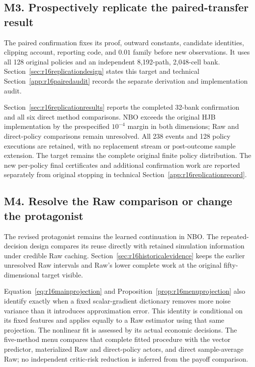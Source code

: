 \subsection*{M3. Prospectively replicate the paired-transfer result}\label{resp:M3}
The paired confirmation fixes its proof, outward constants, candidate identities, clipping account, reporting code, and $0.01$ family before new observations. It uses all 128 original policies and an independent 8,192-path, 2,048-cell bank. Section~\ref{sec:r16replicationdesign} states this target and technical Section~\ref{app:r16pairedaudit} records the separate derivation and implementation audit.

Section~\ref{sec:r16replicationresults} reports the completed 32-bank confirmation and all six direct method comparisons. NBO exceeds the original HJB implementation by the prespecified $10^{-4}$ margin in both dimensions; Raw and direct-policy comparisons remain unresolved. All 238 events and 128 policy executions are retained, with no replacement stream or post-outcome sample extension. The target remains the complete original finite policy distribution. The new per-policy final certificates and additional confirmation work are reported separately from original stopping in technical Section~\ref{app:r16replicationrecord}.

\subsection*{M4. Resolve the Raw comparison or change the protagonist}\label{resp:M4}
The revised protagonist remains the learned continuation in NBO. The repeated-decision design compares its reuse directly with retained simulation information under credible Raw caching. Section~\ref{sec:r16historicalevidence} keeps the earlier unresolved Raw intervals and Raw's lower complete work at the original fifty-dimensional target visible.

Equation~\eqref{eq:r16mainprojection} and Proposition~\ref{prop:r16menuprojection} also identify exactly when a fixed scalar-gradient dictionary removes more noise variance than it introduces approximation error. This identity is conditional on its fixed features and applies equally to a Raw estimator using that same projection. The nonlinear fit is assessed by its actual economic decisions. The five-method menu compares that complete fitted procedure with the vector predictor, materialized Raw and direct-policy actors, and direct sample-average Raw; no independent critic-risk reduction is inferred from the payoff comparison.

